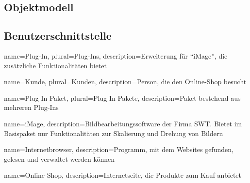 \documentclass[titlepage=true, parskip=full]{scrartcl}
\begin{document}
\subsection{Objektmodell}

\subsection{Benutzerschnittstelle}




%
%
%
%
{
	name=Plug-In,
	plural=Plug-Ins,
	description={Erweiterung für \enquote{\gls{iMage}}, die zusätzliche Funktionalitäten bietet}
}

{
	name=Kunde,
	plural=Kunden,
	description={Person, die den \gls{Online-Shop} besucht}
}

{
	name=Plug-In-Paket,
	plural=Plug-In-Pakete,
	description={Paket bestehend aus mehreren \glspl{Plug-In}}
}

{
	name={iMage},
	description={Bildbearbeitungssoftware der Firma SWT. Bietet im Basispaket nur Funktionalitäten zur Skalierung und Drehung von Bildern}
}

{
	name={Internetbrowser},
	description={Programm, mit dem Websites gefunden, gelesen und verwaltet werden können}
}

{
	name={Online-Shop},
	description={Internetseite, die Produkte zum Kauf anbietet}
}
\end{document}

